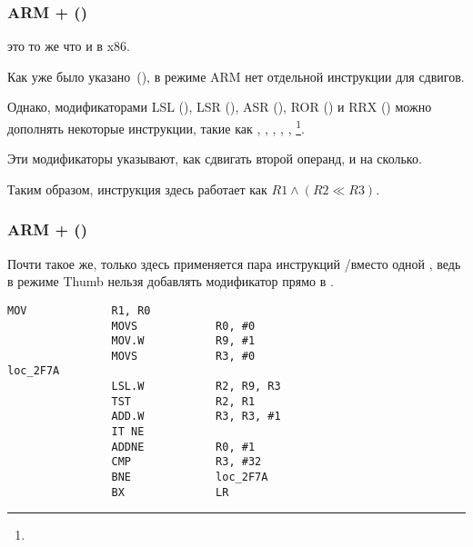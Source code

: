 \subsubsection{ARM + \OptimizingXcodeIV (\ARMMode)}



\TST это то же что и \TEST в x86.

Как уже было указано~(),
в режиме ARM нет отдельной инструкции для сдвигов.

Однако, модификаторами 
LSL (), 
LSR (), 
ASR (), 
ROR () и
RRX () можно дополнять некоторые инструкции, такие как \MOV, \TST,
\CMP, \ADD, \SUB, \RSB\footnote{\DataProcessingInstructionsFootNote}.

Эти модификаторы указывают, как сдвигать второй операнд, и на сколько.

Таким образом, инструкция   здесь работает как $R1 \land (R2 \ll R3)$.

\subsubsection{ARM + \OptimizingXcodeIV (\ThumbTwoMode)}

Почти такое же, только здесь применяется пара инструкций /\TST вместо одной \TST,
ведь в режиме Thumb нельзя добавлять модификатор \LSL прямо в \TST.

\begin{lstlisting}[label=ARM_leaf_example5]
                MOV             R1, R0
                MOVS            R0, #0
                MOV.W           R9, #1
                MOVS            R3, #0
loc_2F7A
                LSL.W           R2, R9, R3
                TST             R2, R1
                ADD.W           R3, R3, #1
                IT NE
                ADDNE           R0, #1
                CMP             R3, #32
                BNE             loc_2F7A
                BX              LR
\end{lstlisting}

